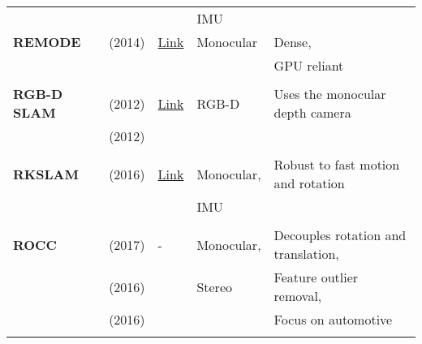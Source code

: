 {\begin{longtable}{l|l|l|l|l}
			&                                   &                                                                    & IMU                   &\\
			\textbf{REMODE}        & \cite{Pizzoli2014} (2014)         & {\href{https://github.com/uzh-rpg/rpg_open_remode}{Link}}          & Monocular             & Dense,\\
			&                                   &                                                                    &                       & GPU reliant\\
			&                                   &                                                                    &                       &\\
			\textbf{RGB-D SLAM}    & \cite{Endres2012} (2012)          & {\href{https://github.com/felixendres/rgbdslam_v2}{Link}}          & RGB-D                 & Uses the monocular depth camera \\
			& \cite{Endres2012a} (2012)         &                                                                    &                       &\\
			&                                   &                                                                    &                       &\\
			\textbf{RKSLAM}        & \cite{Liu2016} (2016)             & {\href{https://zjucvg.net/rkslam/rkslam.html}{Link}}               & Monocular,            & Robust to fast motion and rotation\\
			&                                   &                                                                    & IMU                   &\\
			&                                   &                                                                    &                       &\\
			\textbf{ROCC}          & \cite{Buczko2017} (2017)          & -                                                                  & Monocular,            & Decouples rotation and translation,\\
			& \cite{Buczko2016} (2016)          &                                                                    & Stereo                & Feature outlier removal,\\
			& \cite{Buczko2016a} (2016)         &                                                                    &                       & Focus on automotive\\
			&                                   &                                                                    &                       &\\

\end{longtable}}
